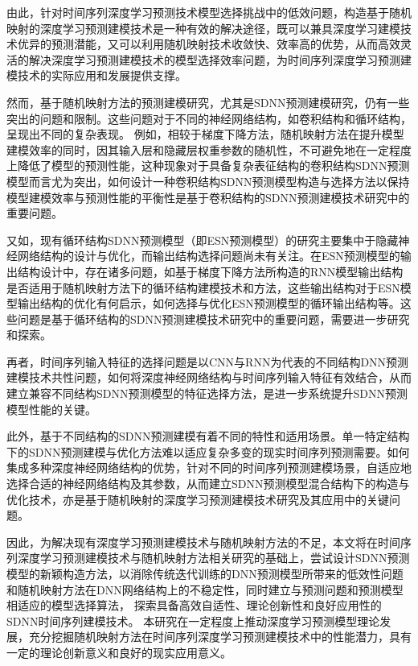 由此，针对时间序列深度学习预测技术模型选择挑战中的低效问题，构造基于随机映射的深度学习预测建模技术是一种有效的解决途径，既可以兼具深度学习建模技术优异的预测潜能，又可以利用随机映射技术收敛快、效率高的优势，从而高效灵活的解决深度学习预测建模技术的模型选择效率问题，为时间序列深度学习预测建模技术的实际应用和发展提供支撑。

然而，基于随机映射方法的预测建模研究，尤其是SDNN预测建模研究，仍有一些突出的问题和限制。这些问题对于不同的神经网络结构，如卷积结构和循环结构，呈现出不同的复杂表现。
例如，相较于梯度下降方法，随机映射方法在提升模型建模效率的同时，因其输入层和隐藏层权重参数的随机性，不可避免地在一定程度上降低了模型的预测性能，这种现象对于具备复杂表征结构的卷积结构SDNN预测模型而言尤为突出，如何设计一种卷积结构SDNN预测模型构造与选择方法以保持模型建模效率与预测性能的平衡性是基于卷积结构的SDNN预测建模技术研究中的重要问题。

又如，现有循环结构SDNN预测模型（即ESN预测模型）的研究主要集中于隐藏神经网络结构的设计与优化\cite{liPSObased2019,chouikhiPSObased2017}，而输出结构选择问题尚未有关注。在ESN预测模型的输出结构设计中，存在诸多问题，如基于梯度下降方法所构造的RNN模型输出结构是否适用于随机映射方法下的循环结构建模技术和方法，这些输出结构对于ESN模型输出结构的优化有何启示，如何选择与优化ESN预测模型的循环输出结构等。这些问题是基于循环结构的SDNN预测建模技术研究中的重要问题，需要进一步研究和探索。

再者，时间序列输入特征的选择问题是以CNN与RNN为代表的不同结构DNN预测建模技术共性问题，如何将深度神经网络结构与时间序列输入特征有效结合，从而建立兼容不同结构SDNN预测模型的特征选择方法，是进一步系统提升SDNN预测模型性能的关键。

此外，基于不同结构的SDNN预测建模有着不同的特性和适用场景。单一特定结构下的SDNN预测建模与优化方法难以适应复杂多变的现实时间序列预测需要。如何集成多种深度神经网络结构的优势，针对不同的时间序列预测建模场景，自适应地选择合适的神经网络结构及其参数，从而建立SDNN预测模型混合结构下的构造与优化技术，亦是基于随机映射的深度学习预测建模技术研究及其应用中的关键问题。

因此，为解决现有深度学习预测建模技术与随机映射方法的不足，本文将在时间序列深度学习预测建模技术与随机映射方法相关研究的基础上，尝试设计SDNN预测模型的新颖构造方法，以消除传统迭代训练的DNN预测模型所带来的低效性问题和随机映射方法在DNN网络结构上的不稳定性，同时建立与预测问题和预测模型相适应的模型选择算法，
探索具备高效自适性、理论创新性和良好应用性的SDNN时间序列建模技术。
本研究在一定程度上推动深度学习预测模型理论发展，充分挖掘随机映射方法在时间序列深度学习预测建模技术中的性能潜力，具有一定的理论创新意义和良好的现实应用意义。
